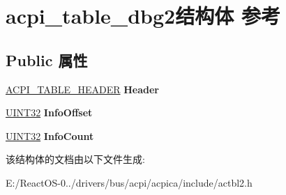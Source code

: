 \hypertarget{structacpi__table__dbg2}{}\section{acpi\+\_\+table\+\_\+dbg2结构体 参考}
\label{structacpi__table__dbg2}
\subsection*{Public 属性}
\begin{DoxyCompactItemize}
\item 
\mbox{\label{structacpi__table__dbg2_a7328b3d148cbc6a5a2c2429c6e88436c}} 
\hyperlink{structacpi__table__header}{A\+C\+P\+I\+\_\+\+T\+A\+B\+L\+E\+\_\+\+H\+E\+A\+D\+ER} {\bfseries Header}
\item 
\mbox{\label{structacpi__table__dbg2_a2a2b05956499e36493fe831fb1beb570}} 
\hyperlink{_processor_bind_8h_ae1e6edbbc26d6fbc71a90190d0266018}{U\+I\+N\+T32} {\bfseries Info\+Offset}
\item 
\mbox{\label{structacpi__table__dbg2_aa4d86708675194709e9b06d08d5d634f}} 
\hyperlink{_processor_bind_8h_ae1e6edbbc26d6fbc71a90190d0266018}{U\+I\+N\+T32} {\bfseries Info\+Count}
\end{DoxyCompactItemize}


该结构体的文档由以下文件生成\+:\begin{DoxyCompactItemize}
\item 
E\+:/\+React\+O\+S-\/0../drivers/bus/acpi/acpica/include/actbl2.\+h\end{DoxyCompactItemize}
